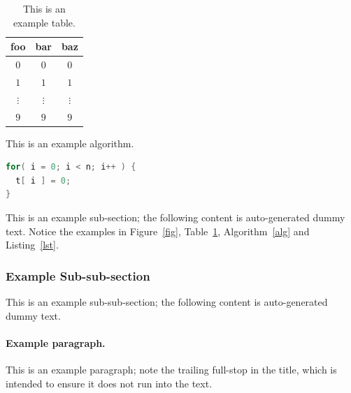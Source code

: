 \begin{table}[t]
\centering
\begin{tabular}{|cc|c|}
\hline
foo      & bar      & baz      \\
\hline
$0     $ & $0     $ & $0     $ \\
$1     $ & $1     $ & $1     $ \\
$\vdots$ & $\vdots$ & $\vdots$ \\
$9     $ & $9     $ & $9     $ \\
\hline
\end{tabular}
\caption{This is an example table.}
\label{tab}
\end{table}

\begin{algorithm}[t]
\caption{This is an example algorithm.}
\label{alg}
\end{algorithm}

\begin{lstlisting}[float={t},caption={This is an example listing.},label={lst},language=C]
for( i = 0; i < n; i++ ) {
  t[ i ] = 0;
}
\end{lstlisting}

This is an example sub-section;
the following content is auto-generated dummy text.
Notice the examples in Figure~\ref{fig}, Table~\ref{tab}, Algorithm~\ref{alg}
and Listing~\ref{lst}.

\subsubsection{Example Sub-sub-section}

This is an example sub-sub-section;
the following content is auto-generated dummy text.

\paragraph{Example paragraph.}

This is an example paragraph; note the trailing full-stop in the title,
which is intended to ensure it does not run into the text.
